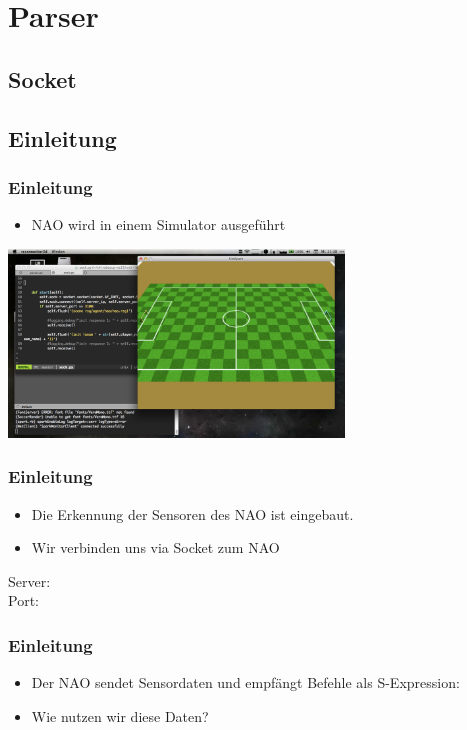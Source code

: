 \section{Parser}
\begin{frame}
\tableofcontents[currentsection]
\end{frame}
\subsection{Socket}
\subsection{Einleitung}

\frame
{
  \frametitle{Einleitung}
  \begin{itemize}
    \item NAO wird in einem Simulator ausgef\"uhrt
  \end{itemize}
  \begin{center}\includegraphics[height=5cm, center]{simulator.pdf}\end{center}
}
  
\frame
{
  \frametitle{Einleitung}
  \begin{itemize}
    \item Die Erkennung der Sensoren des NAO ist eingebaut.
    \item Wir verbinden uns via Socket zum NAO
  \end{itemize}
  
  \begin{center}\tiny{Server: \\ Port: }\end{center}
}

\frame
{
  \frametitle{Einleitung}
  \begin{itemize}
    \item Der NAO sendet Sensordaten und empf\"angt Befehle als S-Expression:\\\vskip0.5cm
  \tiny{}\end{itemize}\begin{itemize}
    \item Wie nutzen wir diese Daten?
  \end{itemize}
}

